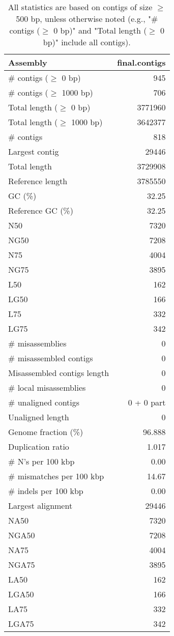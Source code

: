 \documentclass[12pt,a4paper]{article}
\begin{document}
\begin{table}[ht]
\begin{center}
\caption{All statistics are based on contigs of size $\geq$ 500 bp, unless otherwise noted (e.g., "\# contigs ($\geq$ 0 bp)" and "Total length ($\geq$ 0 bp)" include all contigs).}
\begin{tabular}{|l*{1}{|r}|}
\hline
Assembly & final.contigs \\ \hline
\# contigs ($\geq$ 0 bp) & 945 \\ \hline
\# contigs ($\geq$ 1000 bp) & 706 \\ \hline
Total length ($\geq$ 0 bp) & 3771960 \\ \hline
Total length ($\geq$ 1000 bp) & 3642377 \\ \hline
\# contigs & 818 \\ \hline
Largest contig & 29446 \\ \hline
Total length & 3729908 \\ \hline
Reference length & 3785550 \\ \hline
GC (\%) & 32.25 \\ \hline
Reference GC (\%) & 32.25 \\ \hline
N50 & 7320 \\ \hline
NG50 & 7208 \\ \hline
N75 & 4004 \\ \hline
NG75 & 3895 \\ \hline
L50 & 162 \\ \hline
LG50 & 166 \\ \hline
L75 & 332 \\ \hline
LG75 & 342 \\ \hline
\# misassemblies & 0 \\ \hline
\# misassembled contigs & 0 \\ \hline
Misassembled contigs length & 0 \\ \hline
\# local misassemblies & 0 \\ \hline
\# unaligned contigs & 0 + 0 part \\ \hline
Unaligned length & 0 \\ \hline
Genome fraction (\%) & 96.888 \\ \hline
Duplication ratio & 1.017 \\ \hline
\# N's per 100 kbp & 0.00 \\ \hline
\# mismatches per 100 kbp & 14.67 \\ \hline
\# indels per 100 kbp & 0.00 \\ \hline
Largest alignment & 29446 \\ \hline
NA50 & 7320 \\ \hline
NGA50 & 7208 \\ \hline
NA75 & 4004 \\ \hline
NGA75 & 3895 \\ \hline
LA50 & 162 \\ \hline
LGA50 & 166 \\ \hline
LA75 & 332 \\ \hline
LGA75 & 342 \\ \hline
\end{tabular}
\end{center}
\end{table}
\end{document}
